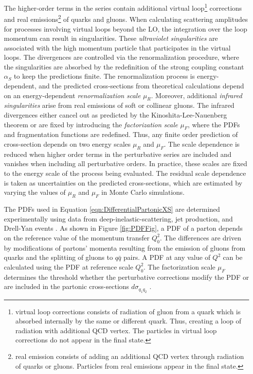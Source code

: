 The higher-order terms in the series contain additional virtual loop\footnote{virtual loop corrections consists of radiation of gluon from a quark which is absorbed internally by the same or different quark. Thus, creating a loop of radiation with additional QCD vertex. The particles in virtual loop corrections do not appear in the final state.} corrections and real emissions\footnote{real emission consists of adding an additional QCD vertex through radiation of quarks or gluons. Particles from real emissions appear in the final state.} of quarks and gluons. When calculating scattering amplitudes for processes involving virtual loops beyond the LO, the integration over the loop momentum can result in singularities. These \textit{ultraviolet singularities} are associated with the high momentum particle that participates in the virtual loops. The divergences are controlled via the renormalization procedure, where the singularities are absorbed by the redefinition of the strong coupling constant $\alpha_S$ to keep the predictions finite. The renormalization process is energy-dependent, and the predicted cross-sections from theoretical calculations depend on an energy-dependent \textit{renormalization scale $\mu_{R}$}. Moreover, additional \textit{infrared singularities} arise from real emissions of soft or collinear gluons. The infrared divergences either cancel out as predicted by the Kinoshita-Lee-Nauenberg theorem \cite{SoftCollinear} or are fixed by introducing the \textit{factorization scale $\mu_{F}$}, where the PDFs and fragmentation functions are redefined. Thus, any finite order prediction of cross-section depends on two energy scales $\mu_{R}$ and $\mu_{F}$. The scale dependence is reduced when higher order terms in the perturbative series are included and vanishes when including all perturbative orders. In practice, these scales are fixed to the energy scale of the process being evaluated. The residual scale dependence is taken as uncertainties on the predicted cross-sections, which are estimated by varying the values of $\mu_{R}$ and $\mu_{F}$ in Monte Carlo simulations.

The PDFs used in Equation \ref{eqn:DifferentialPartonicXS} are determined experimentally using data from deep-inelastic-scattering, jet production, and Drell-Yan events \cite{FixedTargetDrellYan} \cite{PDF4LHC}. As shown in Figure \ref{fig:PDFFig}, a PDF of a parton depends on the reference value of the momentum transfer $Q_{0}^2$. The differences are driven by modifications of partons' momenta resulting from the emission of gluons from quarks and the splitting of gluons to $q\bar{q}$ pairs. A PDF at any value of $Q^2$ can be calculated using the PDF at reference scale $Q_{0}^2$. The factorization scale $\mu_{F}$ determines the threshold whether the perturbative corrections modify the PDF or are included in the partonic cross-sections $d\sigma_{q_{1}q_{2}}$ \cite{QCDForCollider}.

